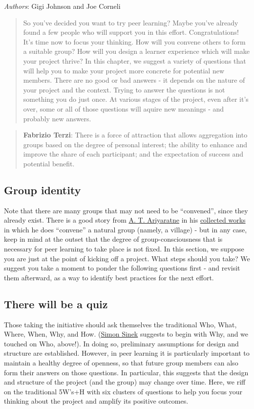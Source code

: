 \emph{Authors}: Gigi Johnson and Joe Corneli

\begin{quote}
So you've decided you want to try peer learning? Maybe you've already
found a few people who will support you in this effort. Congratulations!
It's time now to focus your thinking. How will you convene others to
form a suitable group? How will you design a learner experience which
will make your project thrive? In this chapter, we suggest a variety of
questions that will help you to make your project more concrete for
potential new members. There are no good or bad answers - it depends on
the nature of your project and the context. Trying to answer the
questions is not something you do just once. At various stages of the
project, even after it's over, some or all of those questions will
aquire new meanings - and probably new answers.
\end{quote}
\begin{quote}
\textbf{Fabrizio Terzi}:
There is a force of attraction that allows aggregation into
groups based on the degree of personal interest; the ability to enhance
and improve the share of each participant; and the expectation of success
and potential benefit.
\end{quote}
\subsection{Group identity}

Note that there are many groups that may not need to be ``convened'',
since they already exist. There is a good story from
\href{http://www.sarvodayausa.org/learn/a-t-ariyartne/}{A. T.
Ariyaratne} in his
\href{http://www.sarvodaya.org/about/philosophy/collected-works-vol-1/rural-self-help}{collected
works} in which he does ``convene'' a natural group (namely, a village)
- but in any case, keep in mind at the outset that the degree of
group-consciousness that is necessary for peer learning to take place is
not fixed. In this section, we suppose you are just at the point of
kicking off a project. What steps should you take? We suggest you take a
moment to ponder the following questions first - and revisit them
afterward, as a way to identify best practices for the next effort.

\subsection{There will be a quiz}

Those taking the initiative should ask themselves the traditional Who,
What, Where, When, Why, and How.
(\href{http://en.wikipedia.org/wiki/Simon\_Sinek}{Simon Sinek} suggests
to begin with Why, and we touched on Who, above!). In doing so,
preliminary assumptions for design and structure are established.
However, in peer learning it is particularly important to maintain a
healthy degree of openness, so that future group members can also form
their answers on those questions. In particular, this suggests that the
design and structure of the project (and the group) may change over
time. Here, we riff on the traditional 5W's+H with six clusters of
questions to help you focus your thinking about the project and amplify
its positive outcomes.

